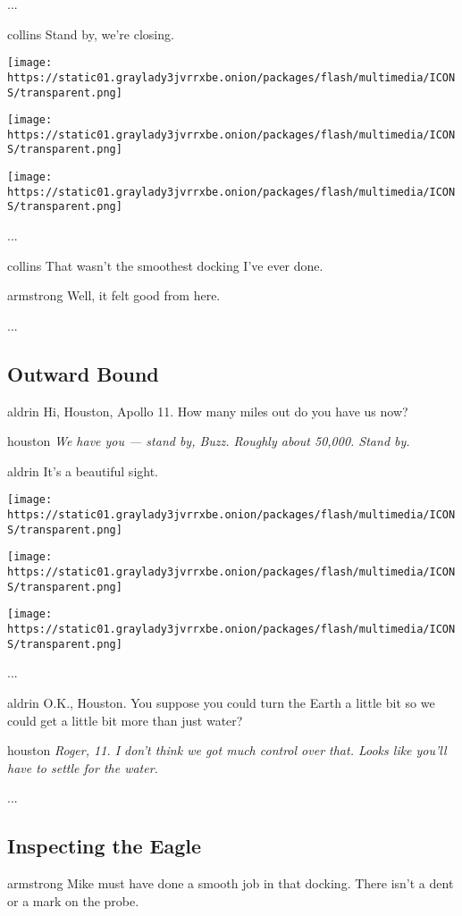 ...

collins Stand by, we're closing.

\texttt{[image: https://static01.graylady3jvrrxbe.onion/packages/flash/multimedia/ICONS/transparent.png]}

\texttt{[image: https://static01.graylady3jvrrxbe.onion/packages/flash/multimedia/ICONS/transparent.png]}

\texttt{[image: https://static01.graylady3jvrrxbe.onion/packages/flash/multimedia/ICONS/transparent.png]}

...

collins That wasn't the smoothest docking I've ever done.

armstrong Well, it felt good from here.

...

\hypertarget{-outward-bound-}{%
\subsection{ Outward Bound }\label{-outward-bound-}}

aldrin Hi, Houston, Apollo 11. How many miles out do you have us now?

houston \emph{We have you --- stand by, Buzz. Roughly about 50,000.
Stand by.}

aldrin It's a beautiful sight.

\texttt{[image: https://static01.graylady3jvrrxbe.onion/packages/flash/multimedia/ICONS/transparent.png]}

\texttt{[image: https://static01.graylady3jvrrxbe.onion/packages/flash/multimedia/ICONS/transparent.png]}

\texttt{[image: https://static01.graylady3jvrrxbe.onion/packages/flash/multimedia/ICONS/transparent.png]}

...

aldrin O.K., Houston. You suppose you could turn the Earth a little bit
so we could get a little bit more than just water?

houston \emph{Roger, 11. I don't think we got much control over that.
Looks like you'll have to settle for the water.}

...

\hypertarget{-inspecting-the-eagle-}{%
\subsection{ Inspecting the Eagle }\label{-inspecting-the-eagle-}}

armstrong Mike must have done a smooth job in that docking. There isn't
a dent or a mark on the probe.

